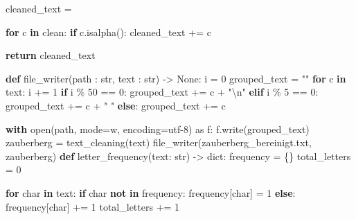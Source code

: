 \documentclass[
  nswissgerman,
  a4paper,
  DIV=11,
  numbers=noendperiod,
  ngerman]{scrreprt}
\newenvironment{Shaded}{\begin{snugshade}}{\end{snugshade}}
\newcommand{\BuiltInTok}[1]{\textcolor[rgb]{0.00,0.23,0.31}{#1}}
\newcommand{\CharTok}[1]{\textcolor[rgb]{0.13,0.47,0.30}{#1}}
\newcommand{\ControlFlowTok}[1]{\textcolor[rgb]{0.00,0.23,0.31}{\textbf{#1}}}
\newcommand{\DecValTok}[1]{\textcolor[rgb]{0.68,0.00,0.00}{#1}}
\newcommand{\ImportTok}[1]{\textcolor[rgb]{0.00,0.46,0.62}{#1}}
\newcommand{\KeywordTok}[1]{\textcolor[rgb]{0.00,0.23,0.31}{\textbf{#1}}}
\newcommand{\NormalTok}[1]{\textcolor[rgb]{0.00,0.23,0.31}{#1}}
\newcommand{\OperatorTok}[1]{\textcolor[rgb]{0.37,0.37,0.37}{#1}}
\newcommand{\StringTok}[1]{\textcolor[rgb]{0.13,0.47,0.30}{#1}}
\newcommand{\VariableTok}[1]{\textcolor[rgb]{0.07,0.07,0.07}{#1}}
\begin{document}
\begin{Shaded}
\begin{Highlighting}[numbers=left,,]
\NormalTok{    cleaned\_text }\OperatorTok{=} \StringTok{\textquotesingle{}\textquotesingle{}}

    \ControlFlowTok{for}\NormalTok{ c }\KeywordTok{in}\NormalTok{ clean:}
        \ControlFlowTok{if}\NormalTok{ c.isalpha():}
\NormalTok{            cleaned\_text }\OperatorTok{+=}\NormalTok{ c}
    
    \ControlFlowTok{return}\NormalTok{ cleaned\_text}

\KeywordTok{def}\NormalTok{ file\_writer(path : }\BuiltInTok{str}\NormalTok{, text : }\BuiltInTok{str}\NormalTok{) }\OperatorTok{{-}\textgreater{}} \VariableTok{None}\NormalTok{:}
\NormalTok{    i }\OperatorTok{=} \DecValTok{0}
\NormalTok{    grouped\_text }\OperatorTok{=} \StringTok{""}
    \ControlFlowTok{for}\NormalTok{ c }\KeywordTok{in}\NormalTok{ text:}
\NormalTok{        i }\OperatorTok{+=} \DecValTok{1}
        \ControlFlowTok{if}\NormalTok{ i }\OperatorTok{\%} \DecValTok{50} \OperatorTok{==} \DecValTok{0}\NormalTok{:}
\NormalTok{            grouped\_text }\OperatorTok{+=}\NormalTok{ c }\OperatorTok{+} \StringTok{"}\CharTok{\textbackslash{}n}\StringTok{"}
        \ControlFlowTok{elif}\NormalTok{ i }\OperatorTok{\%} \DecValTok{5} \OperatorTok{==} \DecValTok{0}\NormalTok{:}
\NormalTok{            grouped\_text }\OperatorTok{+=}\NormalTok{ c }\OperatorTok{+} \StringTok{" "}
        \ControlFlowTok{else}\NormalTok{:}
\NormalTok{            grouped\_text }\OperatorTok{+=}\NormalTok{ c}
        
    \ControlFlowTok{with} \BuiltInTok{open}\NormalTok{(path, mode}\OperatorTok{=}\StringTok{\textquotesingle{}w\textquotesingle{}}\NormalTok{, encoding}\OperatorTok{=}\StringTok{\textquotesingle{}utf{-}8\textquotesingle{}}\NormalTok{) }\ImportTok{as}\NormalTok{ f:}
\NormalTok{        f.write(grouped\_text)}
\NormalTok{zauberberg }\OperatorTok{=}\NormalTok{ text\_cleaning(text)}
\NormalTok{file\_writer(}\StringTok{\textquotesingle{}zauberberg\_bereinigt.txt\textquotesingle{}}\NormalTok{, zauberberg)}
\KeywordTok{def}\NormalTok{ letter\_frequency(text: }\BuiltInTok{str}\NormalTok{) }\OperatorTok{{-}\textgreater{}} \BuiltInTok{dict}\NormalTok{:}
\NormalTok{    frequency }\OperatorTok{=}\NormalTok{ \{\}}
\NormalTok{    total\_letters }\OperatorTok{=} \DecValTok{0}
    
    \ControlFlowTok{for}\NormalTok{ char }\KeywordTok{in}\NormalTok{ text:}
        \ControlFlowTok{if}\NormalTok{ char }\KeywordTok{not} \KeywordTok{in}\NormalTok{ frequency:}
\NormalTok{            frequency[char] }\OperatorTok{=} \DecValTok{1}
        \ControlFlowTok{else}\NormalTok{:}
\NormalTok{            frequency[char] }\OperatorTok{+=} \DecValTok{1}
\NormalTok{        total\_letters }\OperatorTok{+=} \DecValTok{1}
        

\end{Highlighting}
\end{Shaded}
\end{document}
